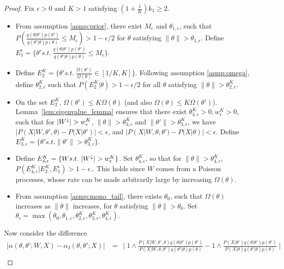 \begin{proof}
  Fix $\epsilon > 0$ and $K > 1$ satisfying $(1 + \frac{1}{K})k_1 \ge 2$.
  \begin{itemize}
    \item  
From assumption \ref{asmp:prior}, there exist 
$M_\epsilon$ and $\theta_{1,\epsilon}$, such that 
$P(\frac{q(\theta | \theta')p(\theta')}{q(\theta' | \theta)p(\theta)}\leq M_\epsilon) > 1 - \epsilon / 2$ 
{for } $\theta$ satisfying $ \| \theta \| > \theta_{1,\epsilon}$.
    Define  $E_1^\epsilon = \{\theta' s.t.\ \frac{q(\theta | \theta')p(\theta')}{q(\theta' | \theta)p(\theta)}\leq M_\epsilon\}$.
    \item Define $E^K_2 = \{\theta' s.t.\ \frac{\Omega(\theta')}{\Omega(\theta)}\in [1/K, K] \}$.
Following assumption \ref{asmp:omega}, define $\theta_{2, \epsilon}^K$ 
such that $P(E^K_2 | \theta) > 1 - \epsilon / 2$ for all $\theta$ satisfying $\| \theta \| > \theta_{2, \epsilon}^K$.
    \item On the set $E^K_2$, $\Omega(\theta') \le K \Omega(\theta)$ (and also
$\Omega(\theta) \le K \Omega(\theta')$).  Lemma~\ref{lem:eigenvalue_lemma}
ensures that there exist $\theta_{3,\epsilon}^K > 0, w_\epsilon^K > 0$, 
such that for ${|W^\downarrow}| > w_\epsilon^K$, 
$ \| \theta \| > \theta_{3,\epsilon}^K$ and 
$ \| \theta' \| > \theta_{3,\epsilon}^K$, we have
$|P(X | W, \theta' , \theta) - P(X | \theta' )| < \epsilon$, and
$|P(X | W, \theta , \theta') - P(X | \theta )| < \epsilon$.
Define      $E_{3, \epsilon}^K = \{\theta' s.t. \| \theta'\| > {\theta}_{3,\epsilon}^K \}$.
    \item Define $E_{4, \epsilon}^K =\{W s.t.\ \mW >  {w}_{\epsilon}^K\}$.
Set $\theta_{4,\epsilon}^K$, so that for $\| \theta \| > \theta_{4,\epsilon}^K$, 
$ P(E_{4,\epsilon}^K|E^K_2, E_1^\epsilon ) > 1 - \epsilon.
$. This holds since $W$ comes from a Poisson processes, whose rate can 
be made arbitrarily large by increasing $\Omega(\theta)$.
    \item From assumption \ref{asmp:mono_tail}, there exists $\theta_0$, such that $\Omega(\theta)$ increases as $\| \theta \|$ increases, for $\theta$ satisfying $\| \theta \| > \theta_0$.
Set ${\theta}_\epsilon =\max(\theta_0, \theta_{1, \epsilon},\theta_{2, \epsilon}^K,{\theta}_{3, \epsilon}^K, \theta_{4, \epsilon}^K)$. \\
  \end{itemize}
  Now consider the difference
\begin{align*}
|\alpha(\theta, \theta'; W, X) - \alpha_I(\theta, \theta'; X)| &= \ \mid 1 \wedge \frac{P(X | W, \theta' , \theta)q(\theta | \theta')p(\theta')}{P(X | W, \theta , \theta')q(\theta' | \theta)p(\theta)} - 1 \wedge \frac{P(X | \theta')q(\theta | \theta')p(\theta')}{P(X | \theta)q(\theta' | \theta)p(\theta)} \mid \\

\end{align*}
\end{proof}
